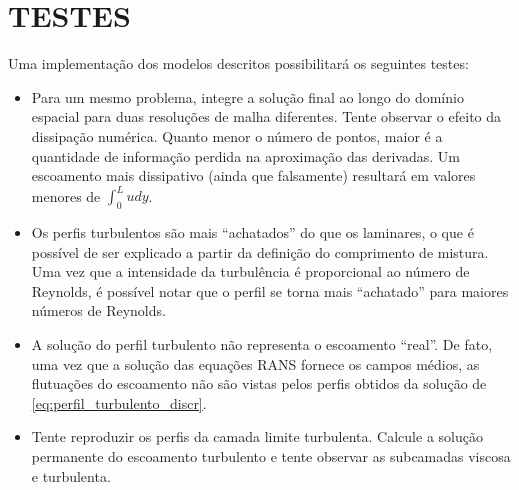 
\section{TESTES}

Uma implementação dos modelos descritos possibilitará os seguintes testes:

\begin{itemize}
   \item Para um mesmo problema, integre a solução final ao longo do
   domínio espacial para duas resoluções de malha diferentes. Tente
   observar o efeito da dissipação numérica. Quanto menor o número de
   pontos, maior é a quantidade de informação perdida na aproximação das
   derivadas. Um escoamento mais dissipativo (ainda que falsamente)
   resultará em valores menores de $\int_0^Ludy$.
   \item Os perfis turbulentos são mais ``achatados'' do que os
   laminares, o que é possível de ser explicado a partir da definição do
   comprimento de mistura. Uma vez que a intensidade da turbulência é
   proporcional ao número de Reynolds, é possível notar que o perfil se
   torna mais ``achatado'' para maiores números de Reynolds.
   \item A solução do perfil turbulento não representa o escoamento
   ``real''. De fato, uma vez que a solução das equações RANS fornece os
   campos médios, as flutuações do escoamento não são vistas pelos
   perfis obtidos da solução de \ref{eq:perfil_turbulento_discr}.
   \item Tente reproduzir os perfis da camada limite turbulenta. Calcule
   a solução permanente do escoamento turbulento e tente observar as
   subcamadas viscosa e turbulenta.
\end{itemize}


